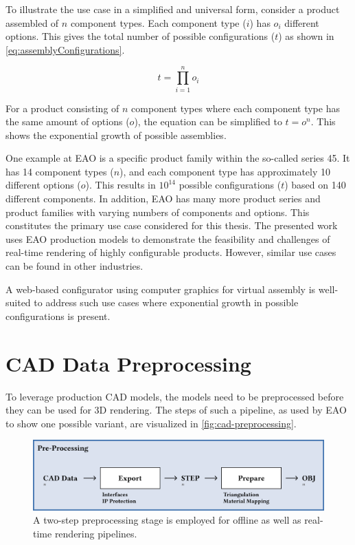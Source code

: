 To illustrate the use case in a simplified and universal form, consider a product assembled of $n$ component types. Each component type ($i$) has $o_i$ different options. This gives the total number of possible configurations ($t$) as shown in \autoref{eq:assemblyConfigurations}.

\begin{equation}
  t = \prod_{i=1}^n o_i
  \label{eq:assemblyConfigurations}
\end{equation}

For a product consisting of $n$ component types where each component type has the same amount of options ($o$), the equation can be simplified to $t = o^n$. This shows the exponential growth of possible assemblies.

One example at EAO is a specific product family within the so-called series 45. It has 14 component types ($n$), and each component type has approximately 10 different options ($o$). This results in $10^{14}$ possible configurations ($t$) based on 140 different components. In addition, EAO has many more product series and product families with varying numbers of components and options. This constitutes the primary use case considered for this thesis. The presented work uses EAO production models to demonstrate the feasibility and challenges of real-time rendering of highly configurable products. However, similar use cases can be found in other industries.

A web-based configurator using computer graphics for virtual assembly is well-suited to address such use cases where exponential growth in possible configurations is present.

\section{CAD Data Preprocessing}

To leverage production \gls{CAD} models, the models need to be preprocessed before they can be used for 3D rendering. The steps of such a pipeline, as used by EAO to show one possible variant, are visualized in \autoref{fig:cad-preprocessing}.

\begin{figure}[H]
  \centering
  \includegraphics[width=0.9\columnwidth]{resources/cad-pipeline-preprocessing.png}
  \caption{A two-step preprocessing stage is employed for offline as well as real-time rendering pipelines.}
  \label{fig:cad-preprocessing}
\end{figure}

